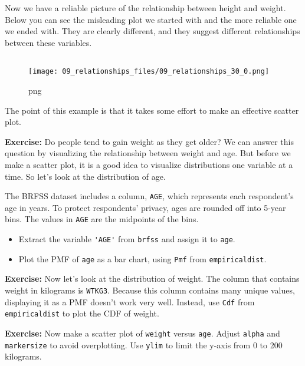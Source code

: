 \documentclass[
]{book}
\newcommand{\passthrough}[1]{#1}
\begin{document}
Now we have a reliable picture of the relationship between height and
weight. Below you can see the misleading plot we started with and the
more reliable one we ended with. They are clearly different, and they
suggest different relationships between these variables.

\begin{lstlisting}[language=Python]
\end{lstlisting}

\begin{figure}
\centering
\texttt{[image: 09\_relationships\_files/09\_relationships\_30\_0.png]}
\caption{png}
\end{figure}

The point of this example is that it takes some effort to make an
effective scatter plot.

\textbf{Exercise:} Do people tend to gain weight as they get older? We
can answer this question by visualizing the relationship between weight
and age. But before we make a scatter plot, it is a good idea to
visualize distributions one variable at a time. So let's look at the
distribution of age.

The BRFSS dataset includes a column, \passthrough{\lstinline!AGE!},
which represents each respondent's age in years. To protect respondents'
privacy, ages are rounded off into 5-year bins. The values in
\passthrough{\lstinline!AGE!} are the midpoints of the bins.

\begin{itemize}
\item
  Extract the variable \passthrough{\lstinline!'AGE'!} from
  \passthrough{\lstinline!brfss!} and assign it to
  \passthrough{\lstinline!age!}.
\item
  Plot the PMF of \passthrough{\lstinline!age!} as a bar chart, using
  \passthrough{\lstinline!Pmf!} from
  \passthrough{\lstinline!empiricaldist!}.
\end{itemize}

\textbf{Exercise:} Now let's look at the distribution of weight. The
column that contains weight in kilograms is
\passthrough{\lstinline!WTKG3!}. Because this column contains many
unique values, displaying it as a PMF doesn't work very well. Instead,
use \passthrough{\lstinline!Cdf!} from
\passthrough{\lstinline!empiricaldist!} to plot the CDF of weight.

\textbf{Exercise:} Now make a scatter plot of
\passthrough{\lstinline!weight!} versus \passthrough{\lstinline!age!}.
Adjust \passthrough{\lstinline!alpha!} and
\passthrough{\lstinline!markersize!} to avoid overplotting. Use
\passthrough{\lstinline!ylim!} to limit the y-axis from 0 to 200
kilograms.
\end{document}
